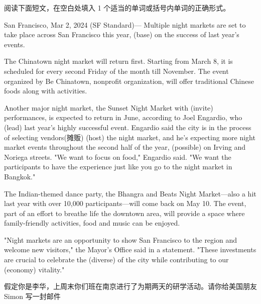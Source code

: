 \documentclass{英语试卷}
\begin{document}
\par 阅读下面短文，在空白处填入 1 个适当的单词或括号内单词的正确形式。\par
\par San Francisco, Mar 2, 2024 (SF Standard)— Multiple night markets are set to take place across San Francisco this year,  (base) on the success of last year's events.\par
\par The Chinatown night market will return first. Starting from March 8, it is scheduled for every second Friday of the month till November. The event organized by Be Chinatown, \blanknum{} nonprofit organization, will offer traditional Chinese foods along with activities.\par
\par Another major night market, the Sunset Night Market with  (invite) performances, is expected to return in June, according to Joel Engardio, who  (lead) last year's highly successful event. Engardio said the city is in the process of selecting vendors(摊贩)  (host) the night market, and he's expecting more night market events throughout the second half of the year,  (possible) on Irving and Noriega streets. "We want to focus on food," Engardio said. "We want the participants to have the experience just like  you go to the night market in Bangkok."\par
\par The Indian-themed dance party, the Bhangra and Beats Night Market—also a hit last year with over 10,000 participants—will come back on May 10. The event, part of an effort to breathe life  the downtown area, will provide a space where family-friendly activities, food and music can be enjoyed.\par
\par "Night markets are an opportunity to show San Francisco to the region and welcome new visitors," the Mayor's Office said in a statement. "These investments are crucial to celebrate the  (diverse) of the city while contributing to our  (economy) vitality."\par
{}
\par 假定你是李华，上周末你们班在南京进行了为期两天的研学活动。请你给美国朋友 Simon 写一封邮件\par
\end{document}
